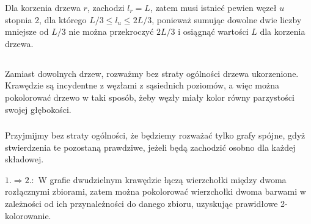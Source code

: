Dla korzenia drzewa $r$, zachodzi $l_r=L$, zatem musi istnieć pewien węzeł $u$ stopnia 2, dla którego $L/3\le l_u\le 2L/3$, ponieważ sumując dowolne dwie liczby mniejsze od $L/3$ nie można przekroczyć $2L/3$ i osiągnąć wartości $L$ dla korzenia drzewa.

\problems

\subsection{} %
\subsubsection{} %
Zamiast dowolnych drzew, rozważmy bez straty ogólności drzewa ukorzenione. Krawędzie są incydentne z węzłami z sąsiednich poziomów, a więc można pokolorować drzewo w taki sposób, żeby węzły miały kolor równy parzystości swojej głębokości.

\subsubsection{} %
Przyjmijmy bez straty ogólności, że będziemy rozważać tylko grafy spójne, gdyż stwierdzenia te pozostaną prawdziwe, jeżeli będą zachodzić osobno dla każdej składowej.
\bigskip

$1.\Rightarrow 2.\!\!:$ W grafie dwudzielnym krawędzie łączą wierzchołki między dwoma rozłącznymi zbiorami, zatem można pokolorować wierzchołki dwoma barwami w zależności od ich przynależności do danego zbioru, uzyskując prawidłowe \hbox{2-kolorowanie}.
\bigskip

